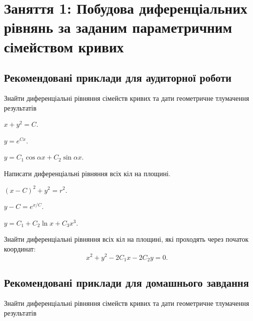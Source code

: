 \section*{Заняття 1: Побудова диференціальних рівнянь за заданим параметричним сімейством кривих}

\subsection*{Рекомендовані приклади для аудиторної роботи}

Знайти диференціальні рівняння сімейств кривих та дати геометричне тлумачення результатів

\begin{problem}
	$x + y^2 =C$.
\end{problem}

\begin{problem}
	$y = e^{C x}$.
\end{problem}

\begin{problem}
	$y = C_1 \cos \alpha x + C_2 \sin \alpha x$.
\end{problem}

\begin{problem}
	Написати диференціальні рівняння всіх кіл на площині.
\end{problem}

\begin{problem}
	$(x - C)^2 + y^2 = r^2$.
\end{problem}

\begin{problem}
	$y - C = e^{x / C}$.
\end{problem}

\begin{problem}
	$y = C_1 + C_2 \ln x + C_3 x^3$.
\end{problem}

\begin{problem}
	Знайти диференціальні рівняння всіх кіл на площині, які проходять через початок координат:
	\[x^2 + y^2 - 2 C_1 x - 2 C_2 y = 0.\]
\end{problem}

\subsection*{Рекомендовані приклади для домашнього завдання}

Знайти диференціальні рівняння сімейств кривих та дати геометричне тлумачення результатів


